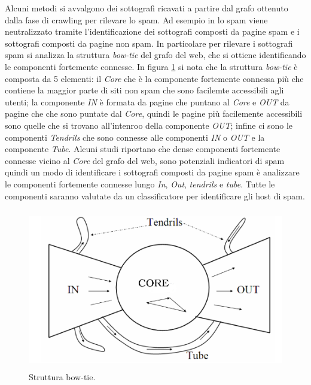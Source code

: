 Alcuni metodi si avvalgono dei sottografi ricavati a partire dal grafo ottenuto dalla fase di crawling per rilevare lo spam. Ad esempio in \cite{Leon-Suematsu:2011:WSD:2052138.2052339} lo spam viene neutralizzato tramite l'identificazione dei sottografi composti da pagine spam e i sottografi composti da pagine non spam. In particolare per rilevare i sottografi spam si analizza la struttura \textit{bow-tie} del grafo del web, che si ottiene identificando le componenti fortemente connesse. In figura \ref{fig:sub} si nota che la struttura \textit{bow-tie} è composta da 5 elementi: il \textit{Core} che è la componente fortemente connessa più che contiene la maggior parte di siti non spam che sono facilemte accessibili agli utenti; la componente \textit{IN} è formata da pagine che puntano al \textit{Core}  e \textit{OUT} da pagine che che sono puntate dal \textit{Core}, quindi le pagine più facilemente accessibili sono quelle che si trovano all'intenroo della componente \textit{OUT}; infine ci 
sono le componenti \textit{Tendrils} che sono connesse alle componenti \textit{IN} o \textit{OUT} e la componente \textit{Tube}. Alcuni studi riportano che dense componenti fortemente connesse vicino al \textit{Core} del grafo del web, sono potenziali indicatori di spam quindi un modo di identificare i sottografi composti da pagine spam è analizzare le componenti fortemente connesse lungo \textit{In}, \textit{Out}, \textit{tendrils} e \textit{tube}. Tutte le componenti saranno valutate da un classificatore per identificare gli host di spam.
\begin{figure}
\centering
\includegraphics[height=7cm]{immagini/sub/sub}
\caption{Struttura bow-tie.}
\label{fig:sub}
\end{figure}
